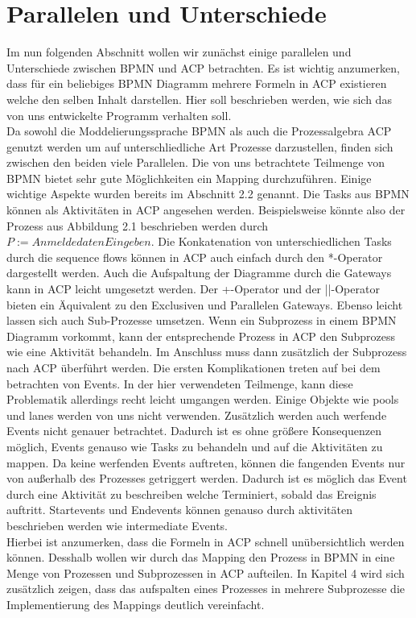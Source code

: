 \section{Parallelen und Unterschiede}\label{Parallelen und Unterschiede}
Im nun folgenden Abschnitt wollen wir zunächst einige parallelen und Unterschiede zwischen BPMN und ACP betrachten. Es ist wichtig anzumerken, dass für ein beliebiges BPMN Diagramm mehrere Formeln in ACP existieren welche den selben Inhalt darstellen. Hier soll beschrieben werden, wie sich das von uns entwickelte Programm verhalten soll.\\
Da sowohl die Moddelierungssprache BPMN als auch die Prozessalgebra ACP genutzt werden um auf unterschliedliche Art Prozesse darzustellen, finden sich zwischen den beiden viele Parallelen. Die von uns betrachtete Teilmenge von BPMN bietet sehr gute Möglichkeiten ein Mapping durchzuführen. Einige wichtige Aspekte wurden bereits im Abschnitt 2.2 genannt. Die Tasks aus BPMN können als Aktivitäten in ACP angesehen werden. Beispielsweise könnte also der Prozess aus Abbildung 2.1 beschrieben werden durch $P:=AnmeldedatenEingeben.$ Die Konkatenation von unterschiedlichen Tasks durch die sequence flows können in ACP auch einfach durch den *-Operator dargestellt werden. Auch die Aufspaltung der Diagramme durch die Gateways kann in ACP leicht umgesetzt werden. Der +-Operator und der ||-Operator bieten ein Äquivalent zu den Exclusiven und Parallelen Gateways. Ebenso leicht lassen sich auch Sub-Prozesse umsetzen. Wenn ein Subprozess in einem BPMN Diagramm vorkommt, kann der entsprechende Prozess in ACP den Subprozess wie eine Aktivität behandeln. Im Anschluss muss dann zusätzlich der Subprozess nach ACP überführt werden.
Die ersten Komplikationen treten auf bei dem betrachten von Events. In der hier verwendeten Teilmenge, kann diese Problematik allerdings recht leicht umgangen werden. Einige Objekte wie pools und lanes werden von uns nicht verwenden. Zusätzlich werden auch werfende Events nicht genauer betrachtet. Dadurch ist es ohne größere Konsequenzen möglich, Events genauso wie Tasks zu behandeln und auf die Aktivitäten zu mappen. Da keine werfenden Events auftreten, können die fangenden Events nur von außerhalb des Prozesses getriggert werden. Dadurch ist es möglich das Event durch eine Aktivität zu beschreiben welche Terminiert, sobald das Ereignis auftritt. Startevents und Endevents können genauso durch aktivitäten beschrieben werden wie intermediate Events.\\
Hierbei ist anzumerken, dass die Formeln in ACP schnell unübersichtlich werden können. Desshalb wollen wir durch das Mapping den Prozess in BPMN in eine Menge von Prozessen und Subprozessen in ACP aufteilen. In Kapitel 4 wird sich zusätzlich zeigen, dass das aufspalten eines Prozesses in mehrere Subprozesse die Implementierung des Mappings deutlich vereinfacht.\\
